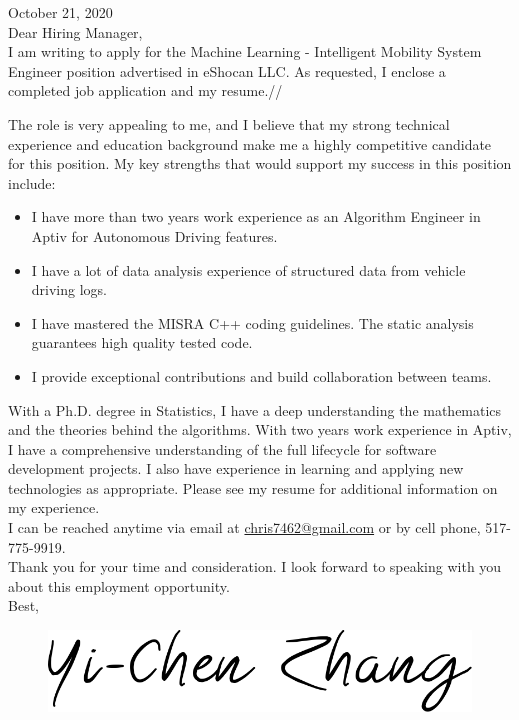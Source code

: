 \documentclass[a4paper,12pt,dvipdfmx]{article}
\begin{document}
\noindent October 21, 2020\\

\noindent Dear Hiring Manager,\\

\noindent I am writing to apply for the Machine Learning - Intelligent Mobility System Engineer position advertised in eShocan LLC. As requested, I enclose a completed job application and my resume.//

\noindent The role is very appealing to me, and I believe that my strong technical experience and education background make me a highly competitive candidate for this position. My key strengths that would support my success in this position include:

\begin{itemize}
  \item I have more than two years work experience as an Algorithm Engineer in Aptiv for Autonomous Driving features.
  \item I have a lot of data analysis experience of structured data from vehicle driving logs.
  \item I have mastered the MISRA C++ coding guidelines. The static analysis guarantees high quality tested code.
  \item I provide exceptional contributions and build collaboration between teams.
\end{itemize}

\noindent With a Ph.D. degree in Statistics, I have a deep understanding the mathematics and the theories behind the algorithms. With two years work experience in Aptiv, I have a comprehensive understanding of the full lifecycle for software development projects. I also have experience in learning and applying new technologies as appropriate. Please see my resume for additional information on my experience.\\

\noindent I can be reached anytime via email at \href{mailto:chris7462@gmail.com}{chris7462@gmail.com} or by cell phone, 517-775-9919.\\

\noindent Thank you for your time and consideration. I look forward to speaking with you about this employment opportunity.\\

\noindent Best,

\begin{figure}[!ht]
  \includegraphics[scale=0.12]{./Signature.png}
\end{figure}
\end{document}
